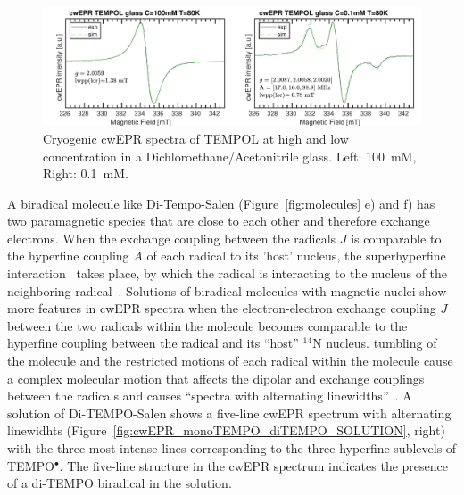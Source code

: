 \begin{figure}[h]
\center
	\includegraphics[width=1\textwidth]{./operando_epr/figures/TEMPOL/cwEPR_TEMPOL_100mM_vs_p1mM_80K.pdf}
	\caption{Cryogenic cwEPR spectra of TEMPOL at high and low concentration in a Dichloroethane/Acetonitrile glass. Left: 100~mM, Right: 0.1~mM.}
	\label{fig:cwEPR_TEMPOL_High_Low_Concentrations}
\end{figure}



\par
A biradical molecule like Di-Tempo-Salen (Figure~\ref{fig:molecules} e) and f) has two paramagnetic species that are close to each other and therefore exchange electrons. When the exchange coupling between the radicals $J$ is comparable to the hyperfine coupling $A$ of each radical to its 'host' nucleus, the superhyperfine interaction~\cite{Carrington_solution_epr} takes place, by which the radical is interacting to the nucleus of the neighboring radical~\cite{Eaton2018}. Solutions of biradical molecules with magnetic nuclei show more features in cwEPR spectra when the electron-electron exchange coupling $J$ between the two radicals within the molecule becomes comparable to the hyperfine coupling between the radical and its ``host'' $^{14}$N nucleus. tumbling of the molecule and the restricted motions of each radical within the molecule cause a complex molecular motion that affects the dipolar and exchange couplings between the radicals and causes ``spectra with alternating linewidths''~\cite{Eaton2018,Carrington_g_factor}. A solution of Di-TEMPO-Salen shows a five-line cwEPR spectrum with alternating linewidhts (Figure~\ref{fig:cwEPR_monoTEMPO_diTEMPO_SOLUTION}, right) with the three most intense lines corresponding to the three hyperfine sublevels of TEMPO$^{\bullet}$. The five-line structure in the cwEPR spectrum indicates the presence of a di-TEMPO biradical in the solution.


